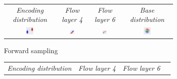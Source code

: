 \begin{figure}[t!]
    \centering
    \begin{subfigure}{\textwidth}
        \centering
        \begin{tabular}{cccc}
            \textit{Encoding distribution} &
            \textit{Flow layer 4} & 
            \textit{Flow layer 6} & 
            \textit{Base distribution} \\
            \includegraphics[width=0.225\textwidth]{figures/experiments_figures/latent_space/graph_coloring/layer_forward_01.pdf} & 
            \includegraphics[width=0.225\textwidth]{figures/experiments_figures/latent_space/graph_coloring/layer_forward_13.pdf}  & 
            \includegraphics[width=0.225\textwidth]{figures/experiments_figures/latent_space/graph_coloring/layer_forward_19.pdf}  & 
            \includegraphics[width=0.225\textwidth]{figures/experiments_figures/latent_space/graph_coloring/layer_forward_25.pdf}
            \\
        \end{tabular}
        \caption{Forward sampling\\[0.5cm] }
    \end{subfigure}
    \begin{subfigure}{\textwidth}
        \centering
        \begin{tabular}{cccc}
            \textit{Encoding distribution} &
            \textit{Flow layer 4} & 
            \textit{Flow layer 6} & 

\end{tabular}
\end{subfigure}
\end{figure}
